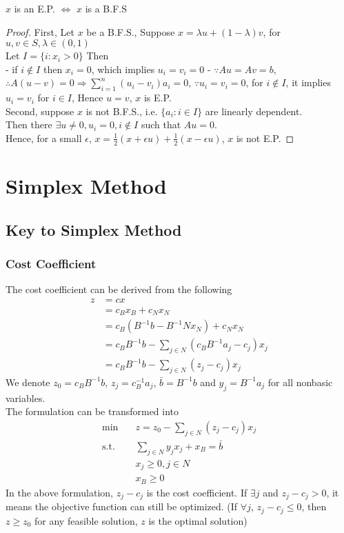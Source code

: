 			\begin{theorem}
				$x$ is an E.P. $\iff$ $x$ is a B.F.S
			\end{theorem}
			
			\begin{proof}
				First, Let $x$ be a B.F.S., Suppose $x=\lambda u + (1 - \lambda) v$, for $u, v \in S, \lambda \in (0, 1)$\\
				Let $I = \{i: x_i > 0\}$ Then\\
				- if $i \notin I$ then $x_i = 0$, which implies $u_i = v_i = 0$
				- $\because Au = Av = b$, $\therefore A(u-v) = 0 \Rightarrow \sum_{i=1}^n(u_i - v_i)a_i = 0$, $\because u_i = v_i = 0$, for $i\notin I$, it implies $u_i = v_i$ for $i\in I$, Hence $u=v$, $x$ is E.P.\\
				Second, suppose $x$ is not B.F.S., i.e. $\{a_i: i \in I\}$ are linearly dependent.\\
				Then there $\exists u\ne 0, u_i =0 , i\notin I$ such that $Au=0$.\\
				Hence, for a small $\epsilon$, $x=\frac12(x + \epsilon u) + \frac12(x - \epsilon u)$, $x$ is not E.P.					
			\end{proof}

		\section{Simplex Method}
			\subsection{Key to Simplex Method}
				\subsubsection{Cost Coefficient}
					The cost coefficient can be derived from the following
					\begin{align}
						z &= cx \\
						  &= c_Bx_B + c_Nx_N \\
						  &= c_B(B^{-1}b - B^{-1}Nx_N) + c_Nx_N\\
						  &= c_BB^{-1}b - \sum_{j\in N}(c_BB^{-1}a_j - c_j)x_j \\
						  &= c_BB^{-1}b - \sum_{j\in N}(z_j-c_j)x_j 
 					\end{align}
 					We denote $z_0 = c_BB^{-1}b$, $z_j = c_B^{-1}a_j$, $\bar{b} = B^{-1}b$ and $y_j = B^{-1}a_j$ for all nonbasic variables.\\
 					The formulation can be transformed into
 					\begin{align}
 						\min \quad & z = z_0 - \sum_{j\in N}(z_j - c_j)x_j\\
 						\text{s.t.} \quad & \sum_{j\in N}y_jx_j + x_B = \bar{b} \\
 										  & x_j \ge 0, j\in N \\
 										  & x_B \ge 0 
 					\end{align}
 					In the above formulation, $z_j - c_j$ is the cost coefficient. If $\exists j$ and $z_j - c_j > 0$, it means the objective function can still be optimized. (If $\forall j$, $z_j - c_j \le 0$, then $z \ge z_0$ for any feasible solution, $z$ is the optimal solution)

